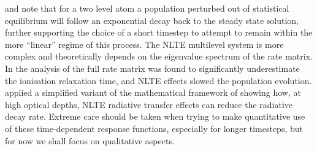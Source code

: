 \citet{Carlsson2002} and \citet{Judge2005} note that for a two level atom a population perturbed out of statistical equilibrium will follow an exponential decay back to the steady state solution, further supporting the choice of a short timestep to attempt to remain within the more ``linear'' regime of this process.
The NLTE multilevel system is more complex and theoretically depends on the eigenvalue spectrum of the rate matrix.
In the analysis of \citet{Carlsson2002} the full rate matrix was found to significantly underestimate the ionisation relaxation time, and NLTE effects slowed the population evolution.
\citet{Judge2005} applied a simplified variant of the mathematical framework of \citet{Gayley1990} showing how, at high optical depths, NLTE radiative transfer effects can reduce the radiative decay rate.
Extreme care should be taken when trying to make quantitative use of these time-dependent response functions, especially for longer timesteps, but for now we shall focus on qualitative aspects.

